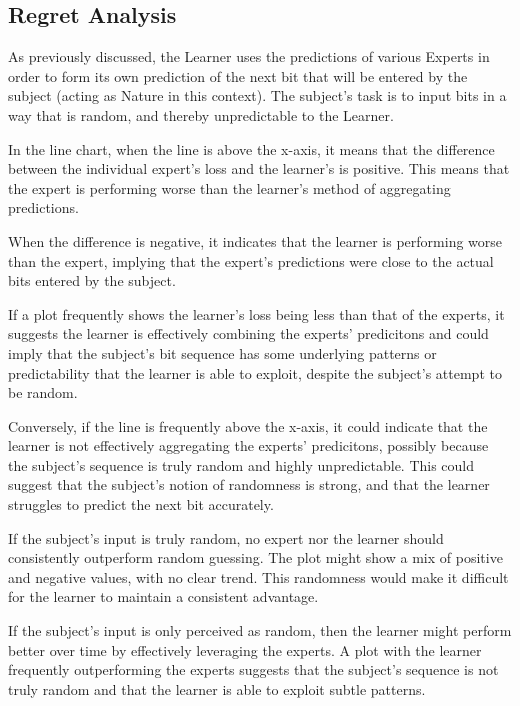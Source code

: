 \subsection{Regret Analysis}

As previously discussed, the Learner uses the predictions of various Experts in order to form its own prediction of the next bit that will be entered by the subject (acting as Nature in this context). The subject's task is to input bits in a way that is random, and thereby unpredictable to the Learner.

In the line chart, when the line is above the x-axis, it means that the difference between the individual expert's loss and the learner's is positive. This means that the expert is performing worse than the learner's method of aggregating predictions.

When the difference is negative, it indicates that the learner is performing worse than the expert, implying that the expert's predictions were close to the actual bits entered by the subject.

If a plot frequently shows the learner's loss being less than that of the experts, it suggests the learner is effectively combining the experts' predicitons and could imply that the subject's bit sequence has some underlying patterns or predictability that the learner is able to exploit, despite the subject's attempt to be random.

Conversely, if the line is frequently above the x-axis, it could indicate that the learner is not effectively aggregating the experts' predicitons, possibly because the subject's sequence is truly random and highly unpredictable. This could suggest that the subject's notion of randomness is strong, and that the learner struggles to predict the next bit accurately.

If the subject's input is truly random, no expert nor the learner should consistently outperform random guessing. The plot might show a mix of positive and negative values, with no clear trend. This randomness would make it difficult for the learner to maintain a consistent advantage.

If the subject's input is only perceived as random, then the learner might perform better over time by effectively leveraging the experts. A plot with the learner frequently outperforming the experts suggests that the subject's sequence is not truly random and that the learner is able to exploit subtle patterns.